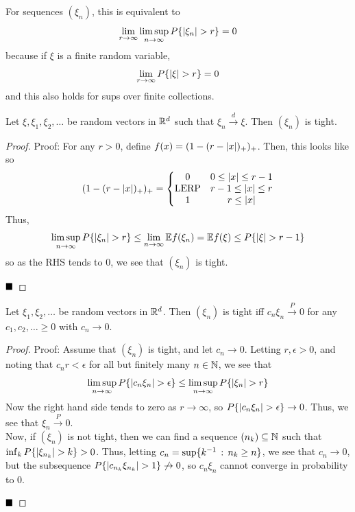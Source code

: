 For sequences $(\xi_n)$, this is equivalent to
\[ \lim_{r \to \infty} \limsup_{n \to \infty} P\{\left\lvert {\xi_n} \right\rvert > r\} = 0 \]
because if $\xi$ is a finite random variable,
\[ \lim_{r \to \infty} P\{\left\lvert {\xi} \right\rvert > r\} = 0 \]
and this also holds for sups over finite collections.

\begin{lemma}
    Let $\xi, \xi_1, \xi_2, \ldots$ be random vectors in $\mathbb{R}^d$ such that $\xi_n \xrightarrow{d} \xi$. Then $(\xi_n)$ is tight.
\end{lemma}
\begin{proof}{Proof:}
    For any $r > 0$, define $f(x) = (1 - (r - \left\lvert {x} \right\rvert)_{+})_{+}$. Then, this looks like
    so
    \[ (1 - (r - \left\lvert {x} \right\rvert)_{+})_{+} = \left\{\begin{matrix} 0 & 0 \leq \left\lvert {x} \right\rvert \leq r - 1 \\ \text{LERP} & r - 1 \leq \left\lvert {x} \right\rvert \leq r \\ 1 & r \leq \left\lvert {x} \right\rvert \end{matrix}\right. \]
    Thus,
    \[ \limsup_{n \to \infty} P\{\left\lvert {\xi_n} \right\rvert > r\} \leq \lim_{n \to \infty} \mathbb{E}f(\xi_n) = \mathbb{E}f(\xi) \leq P\{\left\lvert {\xi} \right\rvert > r - 1\} \]
    so as the RHS tends to $0$, we see that $(\xi_n)$ is tight.

    $\qed$
\end{proof}

\begin{lemma}
    Let $\xi_1, \xi_2, \ldots$ be random vectors in $\mathbb{R}^d$. Then $(\xi_n)$ is tight iff $c_n\xi_n \xrightarrow{P} 0$ for any $c_1, c_2, \ldots \geq 0$ with $c_n \to 0$.
\end{lemma}
\begin{proof}{Proof:}
    Assume that $(\xi_n)$ is tight, and let $c_n \to 0$. Letting $r, \epsilon > 0$, and noting that $c_{n}r < \epsilon$ for all but finitely many $n \in \mathbb{N}$, we see that
    \[ \limsup_{n \to \infty} P\{\left\lvert {c_n\xi_n} \right\rvert > \epsilon\} \leq \limsup_{n \to \infty} P\{\left\lvert {\xi_n} \right\rvert > r\} \]
    Now the right hand side tends to zero as $r \to \infty$, so $P\{\left\lvert {c_n\xi_n} \right\rvert > \epsilon\} \to 0$. Thus, we see that $\xi_n \xrightarrow{P} 0$.\\

    Now, if $(\xi_n)$ is not tight, then we can find a sequence $(n_k) \subseteq \mathbb{N}$ such that $\inf_{k} P\{\left\lvert {\xi_{n_k}} \right\rvert > k\} > 0$. Thus, letting $c_n = \sup\{k^{-1} \, :\, n_k \geq n\}$, we see that $c_n \to 0$, but the subsequence $P\{\left\lvert {c_{n_k}\xi_{n_k}} \right\rvert > 1\} \not \to 0$, so $c_n\xi_n$ cannot converge in probability to $0$. 

    $\qed$
\end{proof}

